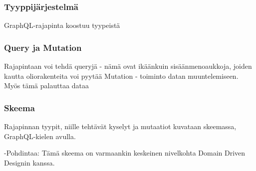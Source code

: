 \hypertarget{tyyppijuxe4rjestelmuxe4}{%
\subsubsection{Tyyppijärjestelmä}\label{tyyppijuxe4rjestelmuxe4}}

GraphQL-rajapinta koostuu tyypeistä

\hypertarget{query-ja-mutation}{%
\subsubsection{Query ja Mutation}\label{query-ja-mutation}}

Rajapintaan voi tehdä queryjä - nämä ovat ikäänkuin sisäänmenoaukkoja,
joiden kautta oliorakenteita voi pyytää Mutation - toiminto datan
muuntelemiseen. Myös tämä palauttaa dataa

\hypertarget{skeema}{%
\subsubsection{Skeema}\label{skeema}}

Rajapinnan tyypit, niille tehtävät kyselyt ja mutaatiot kuvataan
skeemassa, GraphQL-kielen avulla.

-Pohdintaa: Tämä skeema on varmaankin keskeinen nivelkohta Domain Driven
Designin kanssa.
